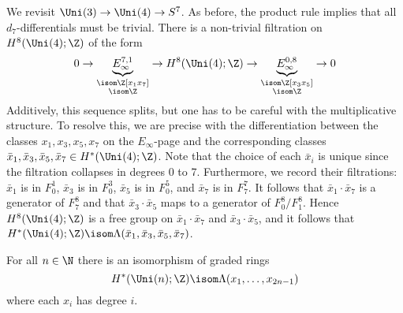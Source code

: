 \documentclass[wip, topology]{bsteffan-lecturenotes}
\begin{document}
\begin{example}
	We revisit $\Uni(3) \to \Uni(4) \to S^7$.
	As before, the product rule implies that all $d_7$-differentials must be trivial.
	There is a non-trivial filtration on $H^8(\Uni(4); \Z)$ of the form
	\begin{equation*}
		0 \to \underbrace{E_\infty^{7, 1}}_{\substack{\isom \Z[x_1 x_7] \\ \isom \Z}} \to H^8(\Uni(4); \Z) \to \underbrace{E_\infty^{0, 8}}_{\substack{\isom \Z[x_3 x_5] \\ \isom \Z}} \to 0
	\end{equation*}
	Additively, this sequence splits, but one has to be careful with the multiplicative structure.
	To resolve this, we are precise with the differentiation between the classes $x_1, x_3, x_5, x_7$ on the $E_\infty$-page and the corresponding classes $\bar{x}_1, \bar{x}_3, \bar{x}_5, \bar{x}_7 \in H^*(\Uni(4); \Z)$.
	Note that the choice of each $\bar{x}_i$ is unique since the filtration collapses in degrees 0 to 7.
	Furthermore, we record their filtrations: $\bar{x}_1$ is in $F^1_0$, $\bar{x}_3$ is in $F^3_0$, $\bar{x}_5$ is in $F^5_0$, and $\bar{x}_7$ is in $F^7_7$.
	It follows that $\bar{x}_1 \cdot \bar{x}_7$ is a generator of $F^8_7$ and that $\bar{x}_3 \cdot \bar{x}_5$ maps to a generator of $F^8_0 / F^8_1$.
	Hence $H^8(\Uni(4); \Z)$ is a free group on $\bar{x}_1 \cdot \bar{x}_7$ and $\bar{x}_3 \cdot \bar{x}_5$, and it follows that $H^*(\Uni(4); \Z) \isom \Lambda(\bar{x}_1, \bar{x}_3, \bar{x}_5, \bar{x}_7)$.
\end{example}
\begin{theorem}
	For all $n \in \N$ there is an isomorphism of graded rings
	\begin{equation*}
		H^*(\Uni(n); \Z) \isom \Lambda(x_1, \ldots, x_{2n - 1})
	\end{equation*}
	where each $x_i$ has degree $i$.
\end{theorem}
\end{document}
